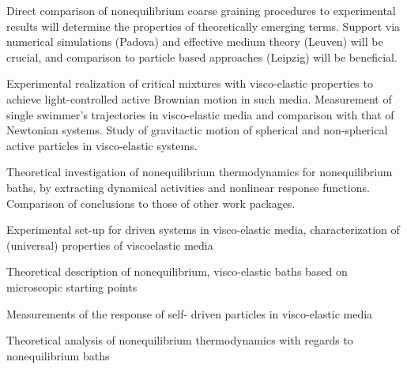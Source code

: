 \begin{workpackage}
\begin{tasklist}
\begin{task}[title=Theoretical identification of nonequilibrium signatures of the bath,id=brown-t3,PM=24,lead=USTUTT,wphases=0-24!1.0,partners={KUL,UNIPD,ULEI}]
Direct comparison of nonequilibrium coarse graining procedures to experimental results will
determine the properties of theoretically emerging terms. Support via numerical simulations
(Padova) and effective medium theory (Leuven) will be crucial, and comparison to particle
based approaches (Leipzig) will be beneficial.
\end{task}

\begin{task}[title=Self-propelled particles in visco-elastic baths,id=brown-t4,PM=24,lead=USTUTT,wphases=24-48!0.5]
Experimental realization of critical mixtures with visco-elastic properties to achieve light-controlled active Brownian motion in such media. Measurement of single swimmer's trajectories in visco-elastic media and comparison with that of Newtonian systems. Study of gravitactic motion of spherical and non-spherical active particles in visco-elastic systems. 
\end{task}
\begin{task}[title=Nonequilbrium thermodynamics,id=brown-t5,PM=24,lead=USTUTT,wphases=24-48!1.0,partners={KUL,UNIPD,ULEI}]
Theoretical investigation of nonequilibrium thermodynamics for nonequilibrium baths, by
extracting dynamical activities and nonlinear response functions. Comparison of conclusions
to those of other work packages.
\end{task}

\end{tasklist}

\begin{wpdelivs}
  \begin{wpdeliv}[due=24,id=brown-d1,dissem=PU,nature=DEM,lead=USTUTT,miles=data1]
      {Experimental set-up for driven systems in visco-elastic media, characterization of (universal) properties of viscoelastic media}
  \end{wpdeliv}
  \begin{wpdeliv}[due=24,id=brown-d2,dissem=PU,nature=DEM,lead=USTUTT,miles=data1]
      {Theoretical description of nonequilibrium, visco-elastic baths based on microscopic starting points}
\end{wpdeliv}
  \begin{wpdeliv}[due=48,id=brown-d3,dissem=PU,nature=DEM,lead=USTUTT,miles=final]
       {Measurements of the response of self- driven particles in visco-elastic media}
 \end{wpdeliv}
\begin{wpdeliv}[due=48,id=brown-d4,dissem=PU,nature=DEM,lead=USTUTT,miles=final]
      {Theoretical analysis of nonequilibrium thermodynamics with regards to nonequilibrium baths}
\end{wpdeliv}
\end{wpdelivs}

\end{workpackage}
